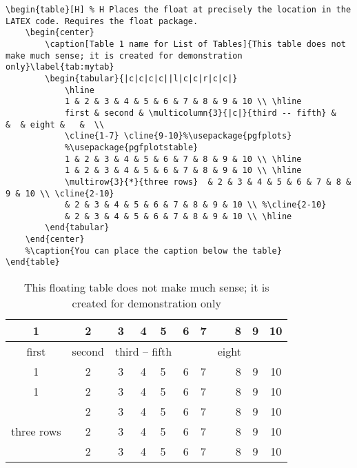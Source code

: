 \documentclass[a4paper,11pt]{article}
\begin{document}
\begin{lstlisting}[breaklines]
\begin{table}[H] % H Places the float at precisely the location in the LATEX code. Requires the float package.
	\begin{center}
		\caption[Table 1 name for List of Tables]{This table does not make much sense; it is created for demonstration only}\label{tab:mytab}
		\begin{tabular}{|c|c|c|c||l|c|c|r|c|c|}
			\hline
			1 & 2 & 3 & 4 & 5 & 6 & 7 & 8 & 9 & 10 \\ \hline
			first & second & \multicolumn{3}{|c|}{third -- fifth} &   &  & eight &   &  \\ 
			\cline{1-7} \cline{9-10}%\usepackage{pgfplots}
			%\usepackage{pgfplotstable}
			1 & 2 & 3 & 4 & 5 & 6 & 7 & 8 & 9 & 10 \\ \hline
			1 & 2 & 3 & 4 & 5 & 6 & 7 & 8 & 9 & 10 \\ \hline
			\multirow{3}{*}{three rows}  & 2 & 3 & 4 & 5 & 6 & 7 & 8 & 9 & 10 \\ \cline{2-10}
			& 2 & 3 & 4 & 5 & 6 & 7 & 8 & 9 & 10 \\ %\cline{2-10}
			& 2 & 3 & 4 & 5 & 6 & 7 & 8 & 9 & 10 \\ \hline
		\end{tabular}
	\end{center}
	%\caption{You can place the caption below the table}
\end{table}
\end{lstlisting}

\begin{table}[H] %
	\begin{center}
		\caption[Table 1 name for List of Tables]{This floating table does not make much sense; it is created for demonstration only}\label{tab:mytab}
		\begin{tabular}{|c|c|c|c||l|c|c|r|c|c|}
			\hline\setlength\fboxsep{3pt} %
			\setlength\fboxrule{1pt} %
			1 & 2 & 3 & 4 & 5 & 6 & 7 & 8 & 9 & 10 \\ \hline
			first & second & \multicolumn{3}{|c|}{third -- fifth} &   &  & eight &   &  \\ 
			\cline{1-7} \cline{9-10}
			1 & 2 & 3 & 4 & 5 & 6 & 7 & 8 & 9 & 10 \\ \hline
			1 & 2 & 3 & 4 & 5 & 6 & 7 & 8 & 9 & 10 \\ \hline
			\multirow{3}{*}{three rows}  & 2 & 3 & 4 & 5 & 6 & 7 & 8 & 9 & 10 \\ \cline{2-10}
			& 2 & 3 & 4 & 5 & 6 & 7 & 8 & 9 & 10 \\ %
			& 2 & 3 & 4 & 5 & 6 & 7 & 8 & 9 & 10 \\ \hline
		\end{tabular}
	\end{center}
\end{table}
\end{document}
